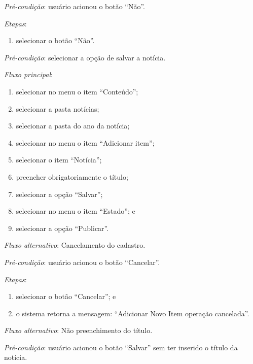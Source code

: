 \noindent \textit{Pré-condição}: usuário acionou o botão ``Não''.

\noindent \textit{Etapas}:

\begin{enumerate}
    \item selecionar o botão ``Não''.
\end{enumerate}


\vspace{0.7cm}

\noindent \textit{Pré-condição}: selecionar a opção de salvar a notícia.

\noindent \textit{Fluxo principal}:

\begin{enumerate}
    \item selecionar no menu o item ``Conteúdo'';
    \item selecionar a pasta notícias;
    \item selecionar a pasta do ano da notícia;
    \item selecionar no menu o item ``Adicionar item'';
    \item selecionar o item ``Notícia'';
    \item preencher obrigatoriamente o título;
    \item selecionar a opção ``Salvar'';
    \item selecionar no menu o item ``Estado''; e
    \item selecionar a opção ``Publicar''.
\end{enumerate}

\noindent \textit{Fluxo alternativo}: Cancelamento do cadastro.

\noindent \textit{Pré-condição}:  usuário acionou o botão ``Cancelar''.

\noindent \textit{Etapas}:

\begin{enumerate}
    \item selecionar o botão ``Cancelar''; e
    \item o sistema retorna a mensagem: ``Adicionar Novo Item operação cancelada''.
\end{enumerate}

\noindent \textit{Fluxo alternativo}: Não preenchimento do título.

\noindent \textit{Pré-condição}: usuário acionou o botão ``Salvar'' sem ter inserido o título da notícia.

